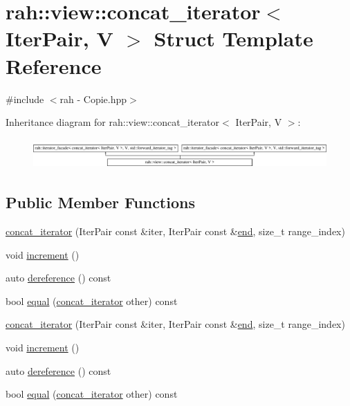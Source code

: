 \hypertarget{structrah_1_1view_1_1concat__iterator}{}\section{rah\+::view\+::concat\+\_\+iterator$<$ Iter\+Pair, V $>$ Struct Template Reference}
\label{structrah_1_1view_1_1concat__iterator}


{\ttfamily \#include $<$rah -\/ Copie.\+hpp$>$}

Inheritance diagram for rah\+::view\+::concat\+\_\+iterator$<$ Iter\+Pair, V $>$\+:\begin{figure}[H]
\begin{center}
\leavevmode
\includegraphics[height=1.149897cm]{structrah_1_1view_1_1concat__iterator}
\end{center}
\end{figure}
\subsection*{Public Member Functions}
\begin{DoxyCompactItemize}
\item 
\mbox{\hyperlink{structrah_1_1view_1_1concat__iterator_a45e7ea9b72e7df5390a2ae09a6923d11}{concat\+\_\+iterator}} (Iter\+Pair const \&iter, Iter\+Pair const \&\mbox{\hyperlink{namespacerah_aaddd1442cd76b96876e692cdefe7261d}{end}}, size\+\_\+t range\+\_\+index)
\item 
void \mbox{\hyperlink{structrah_1_1view_1_1concat__iterator_a6301909457da06a9894f4681353442b4}{increment}} ()
\item 
auto \mbox{\hyperlink{structrah_1_1view_1_1concat__iterator_af36beb1e5fbf0614bf42483c582a0e64}{dereference}} () const
\item 
bool \mbox{\hyperlink{structrah_1_1view_1_1concat__iterator_a6e8021ecde205f2ceba2c167a6954d05}{equal}} (\mbox{\hyperlink{structrah_1_1view_1_1concat__iterator}{concat\+\_\+iterator}} other) const
\item 
\mbox{\hyperlink{structrah_1_1view_1_1concat__iterator_a45e7ea9b72e7df5390a2ae09a6923d11}{concat\+\_\+iterator}} (Iter\+Pair const \&iter, Iter\+Pair const \&\mbox{\hyperlink{namespacerah_aaddd1442cd76b96876e692cdefe7261d}{end}}, size\+\_\+t range\+\_\+index)
\item 
void \mbox{\hyperlink{structrah_1_1view_1_1concat__iterator_a6301909457da06a9894f4681353442b4}{increment}} ()
\item 
auto \mbox{\hyperlink{structrah_1_1view_1_1concat__iterator_af36beb1e5fbf0614bf42483c582a0e64}{dereference}} () const
\item 
bool \mbox{\hyperlink{structrah_1_1view_1_1concat__iterator_a6e8021ecde205f2ceba2c167a6954d05}{equal}} (\mbox{\hyperlink{structrah_1_1view_1_1concat__iterator}{concat\+\_\+iterator}} other) const
\end{DoxyCompactItemize}
